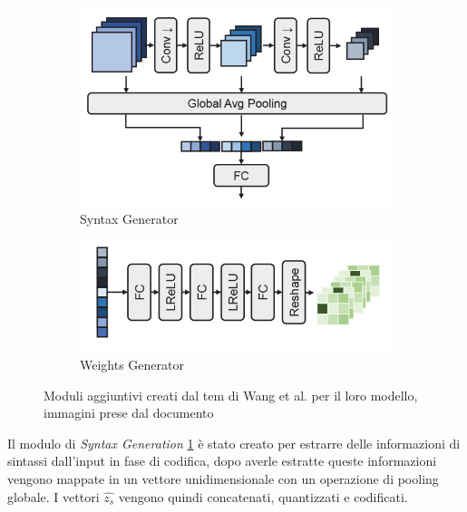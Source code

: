 \begin{figure}[h!]
    \centering
    \begin{subfigure}[]{0.4\textwidth}
        \includegraphics[width=\textwidth]{Immagini/Wang2022_SyntaxGenerator.png}
        \caption{Syntax Generator}
        \label{fig:Wang2022SyntaxGenerator}
    \end{subfigure}
    \hspace*{1 cm}
    \begin{subfigure}[]{0.4\textwidth}
        \includegraphics[width=\textwidth]{Immagini/Wang2022_WeightsGenerator.png}
        \caption{Weights Generator}
        \label{fig:Wang2022WeightsGenerator}
    \end{subfigure}
    \caption{Moduli aggiuntivi creati dal tem di Wang et al. per il loro modello, immagini prese dal documento \cite{wang2022neural}}
    \label{fig:Wang2022Modules}
\end{figure}
Il modulo di \textit{Syntax Generation} \ref{fig:Wang2022SyntaxGenerator} è stato creato per estrarre delle informazioni di sintassi dall’input in fase di codifica, dopo averle estratte queste informazioni vengono mappate in un vettore unidimensionale con un operazione di pooling globale. I vettori $\hat{z_{s}}$ vengono quindi concatenati, quantizzati e codificati.\\
